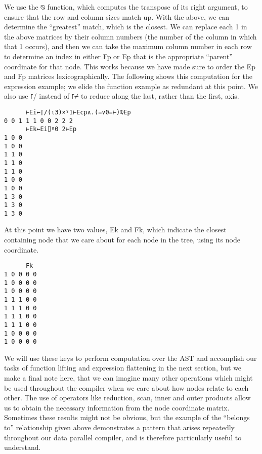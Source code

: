 \documentclass[numbers,preprint]{sigplanconf}
\begin{document}
We use the ⍉ function, which computes the transpose of its right
argument, to ensure that the row and column sizes match up. With the
above, we can determine the “greatest” match, which is the closest.
We can replace each 1 in the above matrices by their column numbers
(the number of the column in which that 1 occurs), and then we can
take the maximum column number in each row to determine an index in
either Fp or Ep that is the appropriate “parent” coordinate for
that node. This works because we have made sure to order the Ep and Fp
matrices lexicographically. The following shows this computation for
the expression example; we elide the function example as redundant
at this point. We also use ⌈/ instead of ⌈⌿ to reduce along
the last, rather than the first, axis.

\begin{verbatim}
      ⊢Ei←⌈/(⍳3)×⍤1⊢Ecp∧.(=∨0=⊢)⍉Ep
0 0 1 1 1 0 0 2 2 2
      ⊢Ek←Ei⌷⍤0 2⊢Ep 
1 0 0
1 0 0
1 1 0
1 1 0
1 1 0
1 0 0
1 0 0
1 3 0
1 3 0
1 3 0
\end{verbatim}

At this point we have two values, Ek and Fk, which indicate the
closest containing node that we care about for each node in the tree,
using its node coordinate.

\begin{verbatim}
      Fk
1 0 0 0 0
1 0 0 0 0
1 0 0 0 0
1 1 1 0 0
1 1 1 0 0
1 1 1 0 0
1 1 1 0 0
1 0 0 0 0
1 0 0 0 0
\end{verbatim}

We will use these keys to perform computation over the AST and
accomplish our tasks of function lifting and expression flattening in
the next section, but we make a final note here, that we can imagine
many other operations which might be used throughout the compiler when
we care about how nodes relate to each other. The use of operators
like reduction, scan, inner and outer products allow us to obtain
the necessary information from the node coordinate matrix. Sometimes
these results might not be obvious, but the example of the “belongs
to” relationship given above demonstrates a pattern that arises
repeatedly throughout our data parallel compiler, and is therefore
particularly useful to understand.
\end{document}
